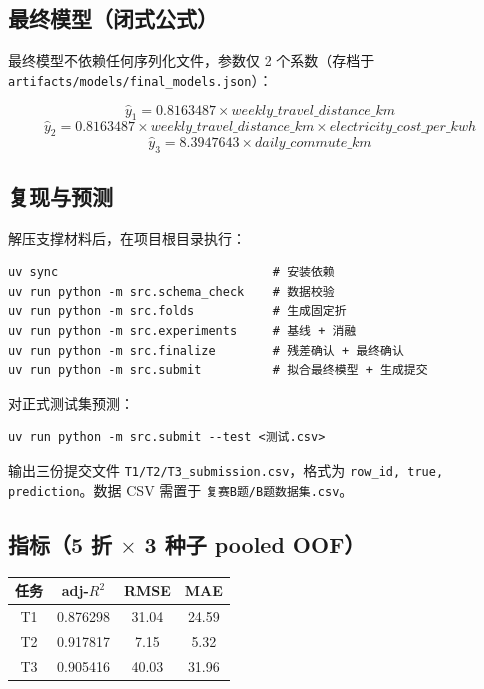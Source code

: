 \documentclass[12pt,a4paper]{ctexart}
\begin{document}
\subsection{最终模型（闭式公式）}

最终模型不依赖任何序列化文件，参数仅 2 个系数（存档于 \texttt{artifacts/models/final\_models.json}）：

\begin{equation}
\hat{y}_1 = 0.8163487 \times weekly\_travel\_distance\_km
\end{equation}
\begin{equation}
\hat{y}_2 = 0.8163487 \times weekly\_travel\_distance\_km \times electricity\_cost\_per\_kwh
\end{equation}
\begin{equation}
\hat{y}_3 = 8.3947643 \times daily\_commute\_km
\end{equation}

\subsection{复现与预测}

解压支撑材料后，在项目根目录执行：

\begin{verbatim}
uv sync                              # 安装依赖
uv run python -m src.schema_check    # 数据校验
uv run python -m src.folds           # 生成固定折
uv run python -m src.experiments     # 基线 + 消融
uv run python -m src.finalize        # 残差确认 + 最终确认
uv run python -m src.submit          # 拟合最终模型 + 生成提交
\end{verbatim}

对正式测试集预测：

\begin{verbatim}
uv run python -m src.submit --test <测试.csv>
\end{verbatim}

输出三份提交文件 \texttt{T1/T2/T3\_submission.csv}，格式为 \texttt{row\_id, true, prediction}。数据 CSV 需置于 \texttt{复赛B题/B题数据集.csv}。

\subsection{指标（5 折 $\times$ 3 种子 pooled OOF）}

\begin{table}[h]
\centering
\begin{tabular}{cccc}
\toprule
\textbf{任务} & \textbf{adj-$R^2$} & \textbf{RMSE} & \textbf{MAE} \\
\midrule
T1 & 0.876298 & 31.04 & 24.59 \\
T2 & 0.917817 & 7.15 & 5.32 \\
T3 & 0.905416 & 40.03 & 31.96 \\
\bottomrule
\end{tabular}
\end{table}
\end{document}

